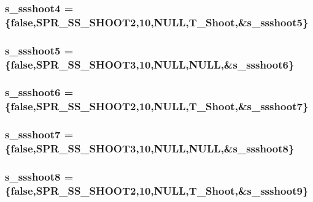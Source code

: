 \label{WL__ACT2_8C_ab375d6f13bacc2be512c19659bf7ba19}
\hypertarget{WL__ACT2_8C_acd69ff06a6d6270617ebe39b6d7409f6}{
\subsubsection[{s\_\-ssshoot4}]{ {\bf s\_\-ssshoot4} = \{false,SPR\_\-SS\_\-SHOOT2,10,NULL,T\_\-Shoot,\&{\bf s\_\-ssshoot5}\}}}
\label{WL__ACT2_8C_acd69ff06a6d6270617ebe39b6d7409f6}
\hypertarget{WL__ACT2_8C_acbff952dcb34e0cc4fef324928b87db8}{
\subsubsection[{s\_\-ssshoot5}]{ {\bf s\_\-ssshoot5} = \{false,SPR\_\-SS\_\-SHOOT3,10,NULL,NULL,\&{\bf s\_\-ssshoot6}\}}}
\label{WL__ACT2_8C_acbff952dcb34e0cc4fef324928b87db8}
\hypertarget{WL__ACT2_8C_a6203ac57c9d9f5068f84164d0137f790}{
\subsubsection[{s\_\-ssshoot6}]{ {\bf s\_\-ssshoot6} = \{false,SPR\_\-SS\_\-SHOOT2,10,NULL,T\_\-Shoot,\&{\bf s\_\-ssshoot7}\}}}
\label{WL__ACT2_8C_a6203ac57c9d9f5068f84164d0137f790}
\hypertarget{WL__ACT2_8C_a0aeff7609fa865c0ba84fd271521bda5}{
\subsubsection[{s\_\-ssshoot7}]{ {\bf s\_\-ssshoot7} = \{false,SPR\_\-SS\_\-SHOOT3,10,NULL,NULL,\&{\bf s\_\-ssshoot8}\}}}
\label{WL__ACT2_8C_a0aeff7609fa865c0ba84fd271521bda5}
\hypertarget{WL__ACT2_8C_a5e908bbb4160751f016f254339d35d1a}{
\subsubsection[{s\_\-ssshoot8}]{ {\bf s\_\-ssshoot8} = \{false,SPR\_\-SS\_\-SHOOT2,10,NULL,T\_\-Shoot,\&{\bf s\_\-ssshoot9}\}}}
